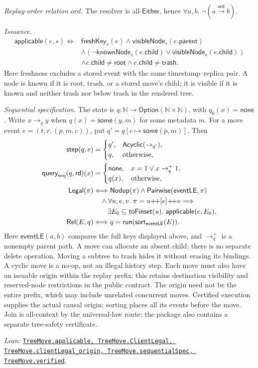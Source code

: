\documentclass[11pt]{article}
\theoremstyle{definition}
\newcommand{\N}{\mathbb N}
\newcommand{\ord}{\mathrel{\xrightarrow{\mathsf{ord}}}}
\newcommand{\src}[2]{\href{../../#1}{\texttt{#2}}}
\newcommand{\anchor}[2]{\par\smallskip\noindent\emph{Lean: }\src{#1}{#2}.}
\begin{document}
\emph{Replay-order relation $ord$.} The resolver is all-$\mathsf{Either}$, hence
$\forall a,b.\;\neg(a\ord b)$.

\emph{Issuance.}
\[
\begin{aligned}
 \mathsf{applicable}(e,s)\Longleftrightarrow{}&
 \mathsf{freshKey}_s(e)\land\mathsf{visibleNode}_s(e.\mathsf{parent})\\
 &\land(\neg\mathsf{knownNode}_s(e.\mathsf{child})
       \lor\mathsf{visibleNode}_s(e.\mathsf{child}))\\
 &\land e.\mathsf{child}\ne\mathsf{root}
 \land e.\mathsf{child}\ne\mathsf{trash}.
\end{aligned}
\]
Here freshness excludes a stored event with the same timestamp--replica pair.
A node is known if it is root, trash, or a stored move's child; it is visible
if it is known and neither trash nor below trash in the rendered tree.

\emph{Sequential specification.} The state is
$q:\N\to\mathsf{Option}(\N\times\N)$, with $q_0(x)=\mathsf{none}$.
Write $x\to_q y$ when $q(x)=\mathsf{some}(y,m)$ for some metadata $m$.
For a move event $e=(t,r,(p,m,c))$, put
$q'=q[c\mapsto\mathsf{some}(p,m)]$. Then
\[
\begin{aligned}
 \mathsf{step}(q,e)&=\begin{cases}
 q',&\mathsf{Acyclic}(\to_{q'}),\\ q,&\text{otherwise},
 \end{cases}\\
 \mathsf{query}_{\rm seq}(q,\mathsf{rd})(x)&=
 \begin{cases}
 \mathsf{none},&x=1\lor x\to_q^+1,\\ q(x),&\text{otherwise},
 \end{cases}\\
 \mathsf{Legal}(\pi)&\Longleftrightarrow
 \mathsf{Nodup}(\pi)\land\mathsf{Pairwise}(\mathsf{eventLE},\pi)\\
 &\quad\land\forall u,e,v.\;\pi=u{+\!+}[e]{+\!+}v\Longrightarrow\\
 &\qquad\exists E_0\subseteq\mathsf{toFinset}(u).\;
       \mathsf{applicable}(e,E_0),\\
 \mathsf{Rel}(E,q)&\Longleftrightarrow
 q=\mathsf{run}(\mathsf{sort}_{\mathsf{eventLE}}(E)).
\end{aligned}
\]
Here $\mathsf{eventLE}(a,b)$ compares the full keys displayed above, and
$\to_q^+$ is a nonempty parent path. A move can allocate an absent child;
there is no separate delete operation. Moving a subtree to trash hides it
without erasing its bindings. A cyclic move is a no-op, not an illegal
history step. Each move must also have an issuable origin within the replay
prefix: this retains destination visibility and reserved-node restrictions
in the public contract. The origin need not be the entire prefix, which may
include unrelated concurrent moves. Certified execution supplies the actual
causal origin; sorting places all its events before the move.
Join is all-context by the universal-law
route; the package also contains a separate tree-safety certificate. \anchor{Sal/MRDTs/Instances/TreeMove.lean}
  {TreeMove.applicable, TreeMove.ClientLegal, TreeMove.clientLegal\_origin,
   TreeMove.sequentialSpec,
   TreeMove.verified}
\end{document}
